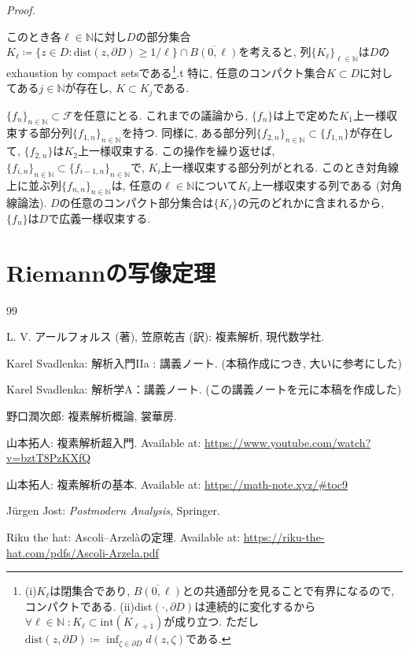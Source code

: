 \documentclass{jsarticle}
\newcommand{\N}{\mathbb{N}}%
\renewenvironment{proof}[1][Proof]{%
\begin{proofbox}%
\textit{#1. }\ignorespaces
}{%
\hfill\qedsymbol%
\end{proofbox}%
}
\begin{document}
\begin{proof}
このとき各$\ell\in\N$に対し$D$の部分集合$K_\ell\coloneq \{z\in D\colon\text{dist}(z, \partial D)\ge 1/\ell\}\cap \overline{B(0, \ell)}$を考えると, 列$\{K_\ell\}_{\ell\in\N}$は$D$のexhaustion by compact setsである\footnote{(i)\;$K_\ell$は閉集合であり, $\overline{B(0, \ell)}$との共通部分を見ることで有界になるので, コンパクトである. (ii)\;dist$(\cdot, \partial D)$は連続的に変化するから $\forall \ell\in\N\; \colon K_\ell\subset \text{int}(K_{\ell+1})$が成り立つ. ただし $\text{dist}(z, \partial D)\coloneq \inf_{\zeta\in\partial D}d(z, \zeta)$である.}.t 特に, 任意のコンパクト集合$K\subset D$に対してある$j\in\N$が存在し, $K\subset K_j$である.  

$\{f_n\}_{n\in\N}\subset\mathcal{F}$を任意にとる. これまでの議論から, $\{f_n\}$は上で定めた$K_1$上一様収束する部分列$\{f_{1,n}\}_{n\in\N}$を持つ. 同様に, ある部分列$\{f_{2,n}\}_{n\in\N}\subset\{f_{1,n}\}$が存在して, $\{f_{2,n}\}$は$K_2$上一様収束する. この操作を繰り返せば, $\{f_{i,n}\}_{n\in\N}\subset\{f_{i-1,n}\}_{n\in\N}$で, $K_i$上一様収束する部分列がとれる. このとき対角線上に並ぶ列$\{f_{n,n}\}_{n\in\N}$は, 任意の$\ell\in\N$について$K_\ell$上一様収束する列である (対角線論法). $D$の任意のコンパクト部分集合は$\{K_\ell\}$の元のどれかに含まれるから, $\{f_n\}$は$D$で広義一様収束する.
\end{proof}

\section{Riemannの写像定理}



\begin{thebibliography}{99}

L. V. アールフォルス (著), 笠原乾吉 (訳):
複素解析,
現代数学社.

Karel Svadlenka:
解析入門IIa : 講義ノート.
(本稿作成につき, 大いに参考にした)

Karel Svadlenka:
解析学A：講義ノート.
(この講義ノートを元に本稿を作成した)

野口潤次郎:
複素解析概論,
裳華房.

山本拓人:
複素解析超入門.
Available at:
\url{https://www.youtube.com/watch?v=bztT8PzKXfQ}


山本拓人:
複素解析の基本.
Available at:
\url{https://math-note.xyz/#toc9}

Jürgen Jost:
\textit{Postmodern Analysis},
Springer.

Riku the hat:
Ascoli–Arzelàの定理.
Available at:
\url{https://riku-the-hat.com/pdfs/Ascoli-Arzela.pdf}
\end{thebibliography}
\end{document}
